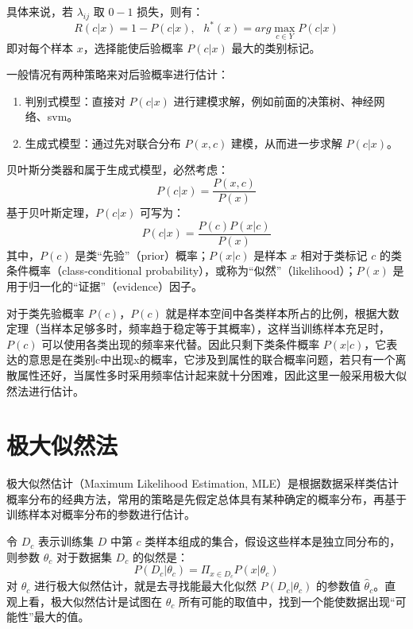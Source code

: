 \documentclass[12pt, a4paper]{article} %
\begin{document}
具体来说，若 $\lambda_{ij}$ 取 $0-1$ 损失，则有：
\begin{equation*}
    R(c | x) = 1 - P(c | x), \ \ \ h^* (x) = arg \max_{c \in Y} P(c | x)
\end{equation*}
即对每个样本 $x$，选择能使后验概率 $P(c | x)$ 最大的类别标记。

一般情况有两种策略来对后验概率进行估计：
\begin{enumerate}[\hspace*{2em} i.]
    \item 判别式模型：直接对 $P(c | x)$ 进行建模求解，例如前面的决策树、神经网络、svm。
    \item 生成式模型：通过先对联合分布 $P(x, c)$ 建模，从而进一步求解 $P(c | x)$。
\end{enumerate}

贝叶斯分类器和属于生成式模型，必然考虑：
\begin{equation*}
    P(c | x) = \frac{P(x, c)}{P(x)}
\end{equation*}
基于贝叶斯定理，$P(c | x)$ 可写为：
\begin{equation*}
    P(c | x) = \frac{P(c) P(x | c)}{P(x)}
\end{equation*}
其中，$P(c)$ 是类“先验”（prior）概率；$P(x | c)$ 是样本 $x$ 相对于类标记 $c$ 的类条件概率（class-conditional probability），或称为“似然”（likelihood）；$P(x)$ 是用于归一化的“证据”（evidence）因子。

对于类先验概率 $P(c)$，$P (c)$ 就是样本空间中各类样本所占的比例，根据大数定理（当样本足够多时，频率趋于稳定等于其概率），这样当训练样本充足时，$P(c)$ 可以使用各类出现的频率来代替。因此只剩下类条件概率 $P(x | c)$，它表达的意思是在类别c中出现x的概率，它涉及到属性的联合概率问题，若只有一个离散属性还好，当属性多时采用频率估计起来就十分困难，因此这里一般采用极大似然法进行估计。

\section{极大似然法}

极大似然估计（Maximum Likelihood Estimation, MLE）是根据数据采样类估计概率分布的经典方法，常用的策略是先假定总体具有某种确定的概率分布，再基于训练样本对概率分布的参数进行估计。

令 $D_c$ 表示训练集 $D$ 中第 $c$ 类样本组成的集合，假设这些样本是独立同分布的，则参数 $\theta_c$ 对于数据集 $D_c$ 的似然是：
\begin{equation*}
    P(D_c | \theta_c) = \Pi_{x \in D_c} P(x | \theta_c)
\end{equation*}
对 $\theta_c$ 进行极大似然估计，就是去寻找能最大化似然 $P(D_c | \theta_c)$ 的参数值 $\hat{\theta}_c$。直观上看，极大似然估计是试图在 $\theta_c$ 所有可能的取值中，找到一个能使数据出现“可能性”最大的值。
\end{document}
